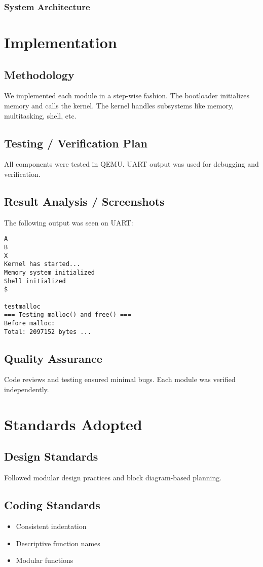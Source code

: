 \documentclass[a4paper,12pt]{report}
\begin{document}
\subsection{System Architecture}

\chapter{Implementation}
\section{Methodology}
We implemented each module in a step-wise fashion. The bootloader initializes memory and calls the kernel. The kernel handles subsystems like memory, multitasking, shell, etc.

\section{Testing / Verification Plan}
All components were tested in QEMU. UART output was used for debugging and verification. 

\section{Result Analysis / Screenshots}
The following output was seen on UART:
\begin{verbatim}
A
B
X
Kernel has started...
Memory system initialized
Shell initialized
$ 

testmalloc
=== Testing malloc() and free() ===
Before malloc:
Total: 2097152 bytes ...
\end{verbatim}

\section{Quality Assurance}
Code reviews and testing ensured minimal bugs. Each module was verified independently.

\chapter{Standards Adopted}
\section{Design Standards}
Followed modular design practices and block diagram-based planning.

\section{Coding Standards}
\begin{itemize}
    \item Consistent indentation
    \item Descriptive function names
    \item Modular functions
\end{itemize}
\end{document}
